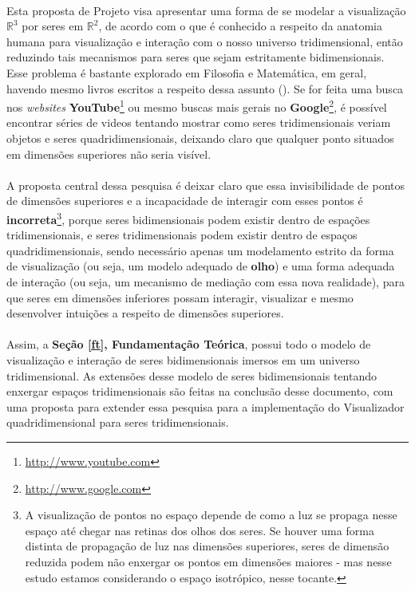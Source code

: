 \documentclass{article}
\newcommand\R{\mathbb{R}}
\begin{document}
	\paragraph{}
	Esta proposta de Projeto visa apresentar uma forma de se modelar a visualização $\R^3$ por seres em $\R^2$, de acordo com o que é conhecido a respeito da anatomia humana para visualização e interação com o nosso universo tridimensional, então reduzindo tais mecanismos para seres que sejam estritamente bidimensionais. Esse problema é bastante explorado em Filosofia e Matemática, em geral, havendo mesmo livros escritos a respeito dessa assunto (\citep[p.~56]{1992Abbott}). Se for feita uma busca nos \textit{websites} \textbf{YouTube}\footnote{\url{http://www.youtube.com}} ou mesmo buscas mais gerais no \textbf{Google}\footnote{\url{http://www.google.com}}, é possível encontrar séries de videos tentando mostrar como seres tridimensionais veriam objetos e seres quadridimensionais, deixando claro que qualquer ponto situados em dimensões superiores não seria visível.
	
	\paragraph{}
	A proposta central dessa pesquisa é deixar claro que essa invisibilidade de pontos de dimensões superiores e a incapacidade de interagir com esses pontos é \textbf{incorreta}\footnote{A visualização de pontos no espaço depende de como a luz se propaga nesse espaço até chegar nas retinas dos olhos dos seres. Se houver uma forma distinta de propagação de luz nas dimensões superiores, seres de dimensão reduzida podem não enxergar os pontos em dimensões maiores - mas nesse estudo estamos considerando o espaço isotrópico, nesse tocante.}, porque seres bidimensionais podem existir dentro de espações tridimensionais, e seres tridimensionais podem existir dentro de espaços quadridimensionais, sendo necessário apenas um modelamento estrito da forma de visualização (ou seja, um modelo adequado de \textbf{olho}) e uma forma adequada de interação (ou seja, um mecanismo de mediação com essa nova realidade), para que seres em dimensões inferiores possam interagir, visualizar e mesmo desenvolver intuições a respeito de dimensões superiores.
	
	\paragraph{}
	Assim, a \textbf{Seção \ref{ft}, Fundamentação Teórica}, possui todo o modelo de visualização e interação de seres bidimensionais imersos em um universo tridimensional. As extensões desse modelo de seres bidimensionais tentando enxergar espaços tridimensionais são feitas na conclusão desse documento, com uma proposta para extender essa pesquisa para a implementação do Visualizador quadridimensional para seres tridimensionais. 
	
\end{document}
